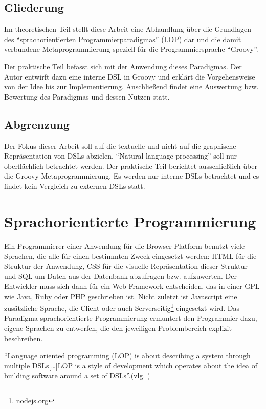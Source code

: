 \documentclass[11pt,english,ngerman, headsepline]{scrreprt}
\begin{document}
\section{Gliederung}

Im theoretischen Teil stellt diese Arbeit eine Abhandlung über die Grundlagen
des ``sprachorientierten Programmierparadigmas'' (LOP) dar und die
damit verbundene Metaprogrammierung speziell für die Programmiersprache ``Groovy''.

Der praktische Teil befasst sich mit der Anwendung dieses Paradigmas. Der Autor
entwirft dazu eine interne DSL in Groovy und erklärt die Vorgehensweise von der
Idee bis zur Implementierung.
Anschließend findet eine Auswertung bzw. Bewertung des Paradigmas und
dessen Nutzen statt.
 
\section{Abgrenzung}
Der Fokus dieser Arbeit soll auf die textuelle und nicht auf die graphische
Repräsentation von DSLs abzielen. “Natural language processing” soll nur
oberflächlich betrachtet werden. Der praktische Teil berichtet ausschließlich
über die Groovy-Metaprogrammierung. 
Es werden nur interne DSLs betrachtet und es findet kein Vergleich zu externen
DSLs statt.


\chapter{ Sprachorientierte Programmierung} 

Ein Programmierer einer Anwendung für die Browser-Platform benutzt viele
Sprachen, die alle für einen bestimmten Zweck eingesetzt werden: HTML für die
Struktur der Anwendung, CSS für die visuelle Repräsentation dieser Struktur
und SQL um Daten aus der Datenbank abzufragen bzw. aufzuwerten. Der Entwickler muss sich dann für
ein Web-Framework entscheiden, das in einer GPL wie
Java, Ruby oder PHP geschrieben ist. Nicht zuletzt ist Javascript eine
zusätzliche Sprache, die Client oder auch Serverseitig\footnote{nodejs.org}
eingesetzt wird. 
Das Paradigma sprachorientierte Programmierung ermuntert den Programmier dazu,
eigene Sprachen zu entwerfen, die den jeweiligen Problembereich explizit
beschreiben.

``Language oriented programming (LOP) is about describing a system through
multiple DSLs[\ldots]LOP is a style of development which operates about
the idea of building software around a set of DSLs''.(vlg.
\cite{fowler2005language})
\end{document}
